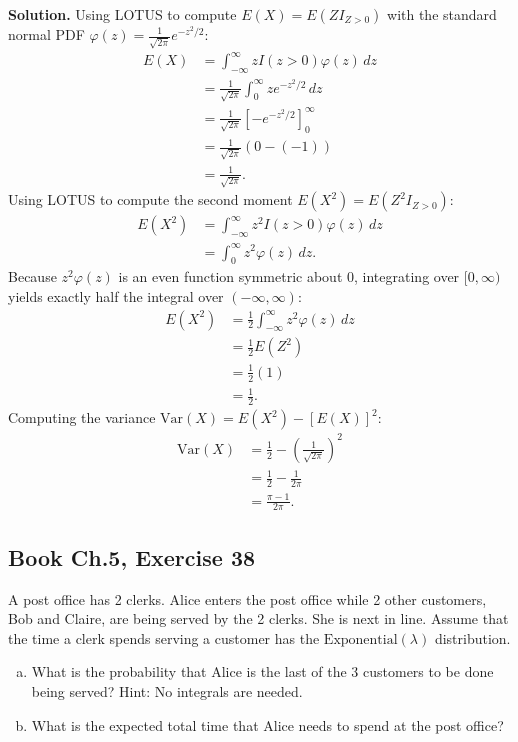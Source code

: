 \documentclass[11pt,a4paper]{article}
\begin{document}
\noindent \textbf{Solution.} Using LOTUS to compute $E(X) = E(Z I_{Z > 0})$ with the standard normal PDF $\varphi(z) = \frac{1}{\sqrt{2\pi}} e^{-z^2/2}$:
\begin{align*}
E(X) &= \int_{-\infty}^{\infty} z I(z > 0) \varphi(z) \, dz \\
&= \frac{1}{\sqrt{2\pi}} \int_{0}^{\infty} z e^{-z^2/2} \, dz \\
&= \frac{1}{\sqrt{2\pi}} \left[ -e^{-z^2/2} \right]_{0}^{\infty} \\
&= \frac{1}{\sqrt{2\pi}} (0 - (-1)) \\
&= \frac{1}{\sqrt{2\pi}}.
\end{align*}
Using LOTUS to compute the second moment $E(X^2) = E\left( Z^2 I_{Z > 0} \right)$:
\begin{align*}
E(X^2) &= \int_{-\infty}^{\infty} z^2 I(z > 0) \varphi(z) \, dz \\
&= \int_{0}^{\infty} z^2 \varphi(z) \, dz.
\end{align*}
Because $z^2 \varphi(z)$ is an even function symmetric about $0$, integrating over $[0, \infty)$ yields exactly half the integral over $(-\infty, \infty)$:
\begin{align*}
E(X^2) &= \frac{1}{2} \int_{-\infty}^{\infty} z^2 \varphi(z) \, dz \\
&= \frac{1}{2} E(Z^2) \\
&= \frac{1}{2} (1) \\
&= \frac{1}{2}.
\end{align*}
Computing the variance $\text{Var}(X) = E(X^2) - [E(X)]^2$:
\begin{align*}
\text{Var}(X) &= \frac{1}{2} - \left( \frac{1}{\sqrt{2\pi}} \right)^2 \\
&= \frac{1}{2} - \frac{1}{2\pi} \\
&= \frac{\pi - 1}{2\pi}.
\end{align*}

\vspace{10pt}
\subsection{Book Ch.5, Exercise 38}
\begin{tcolorbox}[title={Book Ch.5, Exercise 38}]
A post office has 2 clerks. Alice enters the post office while 2 other customers, Bob and Claire, are being served by the 2 clerks. She is next in line. Assume that the time a clerk spends serving a customer has the $\text{Exponential}(\lambda)$ distribution.
\begin{enumerate}[(a)]
\item What is the probability that Alice is the last of the 3 customers to be done being served?
Hint: No integrals are needed.
\item What is the expected total time that Alice needs to spend at the post office?
\end{enumerate}
\end{tcolorbox}
\end{document}
